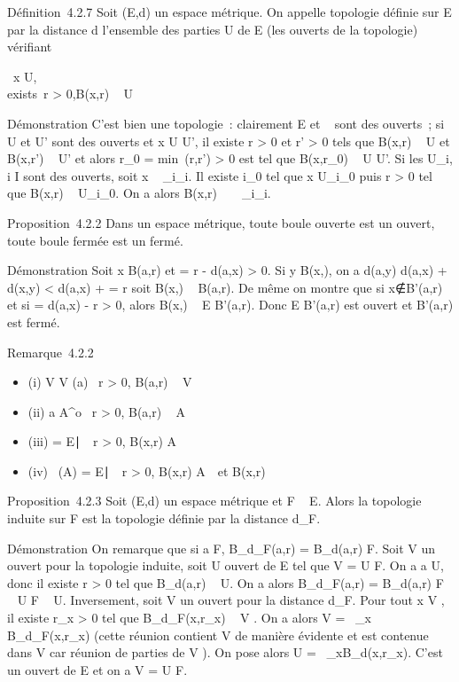 \documentclass[]{article}
\begin{document}
Définition~4.2.7 Soit (E,d) un espace métrique. On appelle topologie
définie sur E par la distance d l'ensemble des parties U de E (les
ouverts de la topologie) vérifiant

\forall~x \in U, \\exists~r
\textgreater{} 0,\quad B(x,r) \subset~ U

Démonstration C'est bien une topologie~: clairement E et \varnothing~ sont des
ouverts~; si U et U' sont des ouverts et x \in U \bigcap U', il existe r
\textgreater{} 0 et r' \textgreater{} 0 tels que B(x,r) \subset~ U et B(x,r') \subset~
U' et alors r\_0 = min~(r,r')
\textgreater{} 0 est tel que B(x,r\_0) \subset~ U \bigcap U'. Si les
U\_i, i \in I sont des ouverts, soit x
\in\⋃ ~
\_i\inIU\_i. Il existe i\_0 tel que x \in
U\_i\_0 puis r \textgreater{} 0 tel que B(x,r) \subset~
U\_i\_0. On a alors B(x,r)
\subset~\⋃ ~
\_i\inIU\_i.

Proposition~4.2.2 Dans un espace métrique, toute boule ouverte est un
ouvert, toute boule fermée est un fermé.

Démonstration Soit x \in B(a,r) et \rho = r - d(a,x) \textgreater{} 0. Si y \in
B(x,\rho), on a d(a,y) \leq d(a,x) + d(x,y) \textless{} d(a,x) + \rho = r soit
B(x,\rho) \subset~ B(a,r). De même on montre que si
x∉B'(a,r) et si \rho = d(a,x) - r \textgreater{}
0, alors B(x,\rho) \subset~ E \diagdown B'(a,r). Donc E \diagdown B'(a,r) est ouvert et B'(a,r)
est fermé.

Remarque~4.2.2

\begin{itemize}
\itemsep1pt\parskip0pt
\item
  (i) V \in V (a) \Leftrightarrow
  \exists~r \textgreater{} 0, B(a,r) \subset~ V
\item
  (ii) a \in A^o \Leftrightarrow
  \exists~r \textgreater{} 0, B(a,r) \subset~ A
\item
  (iii) \overlineA = \x \in
  E∣\forall~~r
  \textgreater{} 0, B(x,r) \bigcap
  A\neq~\varnothing~\
\item
  (iv) \mathrmFr~(A) =
  \x \in
  E∣\forall~~r
  \textgreater{} 0, B(x,r) \bigcap
  A\neq~\varnothing~\text et B(x,r)
  \bigcapcA\neq~\varnothing~\
\end{itemize}

Proposition~4.2.3 Soit (E,d) un espace métrique et F \subset~ E. Alors la
topologie induite sur F est la topologie définie par la distance
d\_F.

Démonstration On remarque que si a \in F, B\_d\_F(a,r) =
B\_d(a,r) \bigcap F. Soit V un ouvert pour la topologie induite, soit
U ouvert de E tel que V = U \bigcap F. On a a \in U, donc il existe r
\textgreater{} 0 tel que B\_d(a,r) \subset~ U. On a alors
B\_d\_F(a,r) = B\_d(a,r) \bigcap F \subset~ U \bigcap F \subset~ U.
Inversement, soit V un ouvert pour la distance d\_F. Pour tout x
 , il existe r\_x \textgreater{} 0 tel que
B\_d\_F(x,r\_x) \subset~ V . On a alors V
= \⋃  ~\_x\inV
B\_d\_F(x,r\_x) (cette réunion contient V de
manière évidente et est contenue dans V car réunion de parties de V ).
On pose alors U =\ \⋃
 \_x\inV B\_d(x,r\_x). C'est un ouvert de E et
on a V = U \bigcap F.
\end{document}
